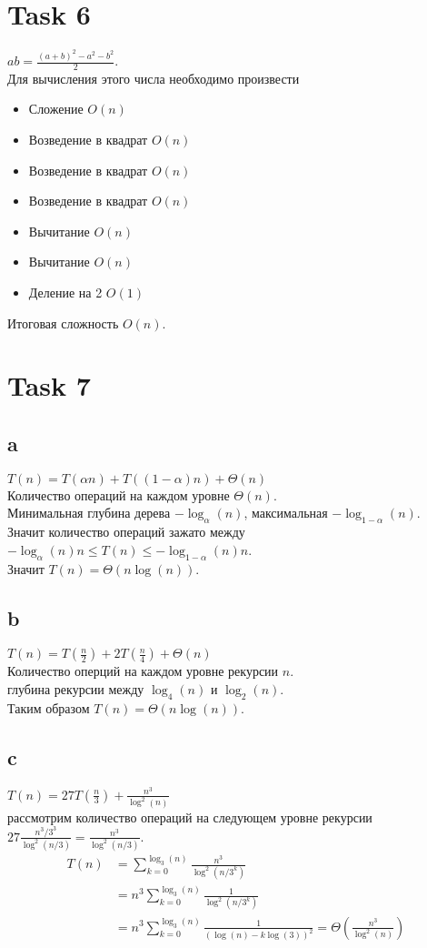 \documentclass[12pt]{exam}
\begin{document}
\section*{Task 6}
$ab = \frac{(a + b)^2 - a^2 - b^2}{2}$. \\
Для вычисления этого числа необходимо произвести
\begin{itemize}
    \item Сложение $O(n)$
    \item Возведение в квадрат $O(n)$
    \item Возведение в квадрат $O(n)$
    \item Возведение в квадрат $O(n)$
    \item Вычитание $O(n)$
    \item Вычитание $O(n)$
    \item Деление на 2 $O(1)$
\end{itemize}
Итоговая сложность $O(n)$.

\section*{Task 7}
\subsection*{a}
$T(n) = T(\alpha n) + T((1 - \alpha) n) + \Theta(n)$\\
Количество операций на каждом уровне $\Theta(n)$. \\
Минимальная глубина дерева $-\log_{\alpha} (n)$, максимальная $-\log_{1 - \alpha}(n)$.\\
Значит количество операций зажато между $-\log_{\alpha} (n) n \leq T(n) \leq -\log_{1 - \alpha}(n) n$.\\
Значит $T(n) = \Theta(n \log(n))$.

\subsection*{b}
$T(n) = T(\frac{n}{2}) + 2T(\frac{n}{4}) + \Theta(n)$\\
Количество оперций на каждом уровне рекурсии $n$. \\
глубина рекурсии между $\log_4(n)$ и $\log_2(n)$. \\
Таким образом $T(n) = \Theta(n \log(n))$.\\

\subsection*{c}
$T(n) = 27 T(\frac{n}{3}) + \frac{n^3}{\log^2(n)}$ \\
рассмотрим количество операций на следующем уровне рекурсии 
$27 \frac{n^3 / 3^3}{\log^2(n / 3)} = \frac{n^3}{\log^2(n / 3)}$.\\
\begin{align*}
    T(n) &= \sum_{k=0}^{\log_3(n)} \frac{n^3}{\log^2(n / 3^k)} \\
         &= n^3 \sum_{k=0}^{\log_3(n)} \frac{1}{\log^2(n / 3^k)} \\
         &= n^3 \sum_{k=0}^{\log_3(n)} \frac{1}{(\log(n) - k \log(3))^2} = \Theta\left(\frac{n^3}{\log^2(n)}\right)
\end{align*}
\end{document}
